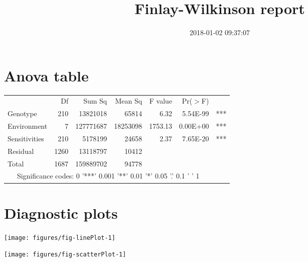 \documentclass[a4paper,11pt]{article}\usepackage[]{graphicx}\usepackage[]{color}
\title{Finlay-Wilkinson report}%
\author{\vspace{-5ex}}
\date{2018-01-02 09:37:07}
\makeatletter
\def\maxwidth{ %
  \ifdim\Gin@nat@width>\linewidth
    \linewidth
  \else
    \Gin@nat@width
  \fi
}
\newenvironment{knitrout}{}{} %
\makeatother
\begin{document}


\maketitle
\singlespacing

\section{Anova table}

\begin{table}[ht]
\begin{flushleft}
\begin{tabular}{lrrrrrl}
  & Df & Sum Sq & Mean Sq & F value & Pr($>$F) &  \\ 
 Genotype & 210 & 13821018 & 65814 & 6.32 & 5.54E-99 & *** \\ 
  Environment & 7 & 127771687 & 18253098 & 1753.13 & 0.00E+00 & *** \\ 
  Sensitivities & 210 & 5178199 & 24658 & 2.37 & 7.65E-20 & *** \\ 
  Residual & 1260 & 13118797 & 10412 &  &  &  \\ 
  Total & 1687 & 159889702 & 94778 &  &  &  \\ 
   \hline  \multicolumn{6}{c}{Significance codes:  0 '***' 0.001 '**' 0.01 '*' 0.05 '.' 0.1 ' ' 1} \\\end{tabular}
\label{anova}
\end{flushleft}
\end{table}


\section{Diagnostic plots}
\begin{knitrout}
\color{fgcolor}

\texttt{[image: figures/fig-linePlot-1]} \hfill{}



\end{knitrout}
\clearpage
\begin{knitrout}
\color{fgcolor}

{\centering \texttt{[image: figures/fig-scatterPlot-1]} 

}



\end{knitrout}
\end{document}
